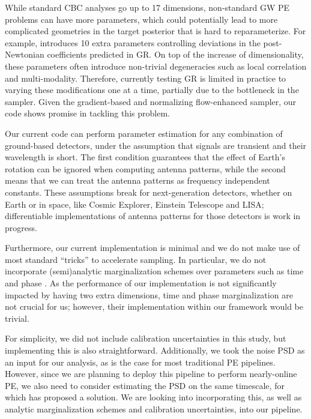 \documentclass[twocolumn]{aastex631}
\begin{document}
While standard CBC analyses go up to 17 dimensions, non-standard GW PE problems
can have more parameters, which could potentially lead to more complicated
geometries in the target posterior that is hard to reparameterize. For example,
\cite{LIGOScientific:2021sio} introduces 10 extra parameters controlling
deviations in the post-Newtonian coefficients predicted in GR. On top of the
increase of dimensionality, these parameters often introduce non-trivial
degeneracies such as local correlation and multi-modality. Therefore, currently
testing GR is limited in practice to varying these modifications one at a time,
partially due to the bottleneck in the sampler.  Given the gradient-based and
normalizing flow-enhanced sampler, our code shows promise in tackling this
problem.

Our current code can perform parameter estimation for any combination of
ground-based detectors, under the assumption that signals are
transient and their wavelength is short. The first condition guarantees that
the effect of Earth's rotation can be ignored when computing antenna patterns,
while the second means that we can treat the antenna patterns as frequency
independent constants. These assumptions break for next-generation detectors,
whether on Earth or in space, like Cosmic Explorer, Einstein Telescope and
LISA; differentiable implementations of antenna patterns for those detectors is
work in progress.

Furthermore, our current implementation is minimal and we do not make use of
most standard ``tricks'' to accelerate sampling.  In particular, we do not
incorporate (semi)analytic marginalization schemes over parameters such as time
and phase \citep{2019PASA...36...10T}. As the performance of our implementation is not
significantly impacted by having two extra dimensions, time and phase
marginalization are not crucial for us;
however, their implementation within our framework would be trivial.

For simplicity, we did not include calibration uncertainties in this study, but
implementing this is also straightforward. Additionally,
we took the noise PSD as an input for our analysis, as is the case for most
traditional PE pipelines.  However, since we are planning to deploy this
pipeline to perform nearly-online PE, we also need to consider estimating the
PSD on the same timescale, for which \cite{Cornish:2021wxy} has proposed a
solution. We are looking into incorporating this, as well as analytic
marginalization schemes and calibration uncertainties, into our pipeline.
\end{document}
